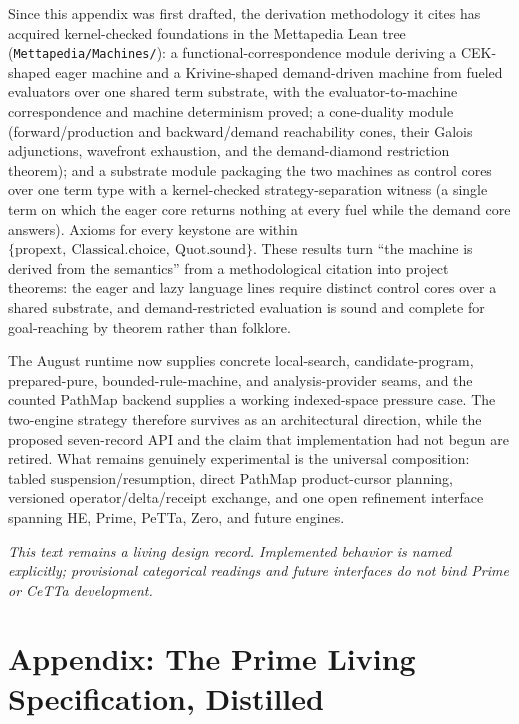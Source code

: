\documentclass[11pt]{article}
\newcommand{\code}[1]{\texttt{#1}}
\newcommand{\PeTTa}{\textup{PeTTa}}
\newcommand{\CeTTa}{\textup{CeTTa}}
\newcommand{\PathMap}{\textup{PathMap}}
\begin{document}
Since this appendix was first drafted, the derivation methodology it
cites has acquired kernel-checked foundations in the Mettapedia Lean
tree (\code{Mettapedia/Machines/}): a functional-correspondence module
deriving a CEK-shaped eager machine and a Krivine-shaped demand-driven
machine from fueled evaluators over one shared term substrate, with the
evaluator-to-machine correspondence and machine determinism proved; a
cone-duality module (forward/production and backward/demand reachability
cones, their Galois adjunctions, wavefront exhaustion, and the
demand-diamond restriction theorem); and a substrate module packaging
the two machines as control cores over one term type with a
kernel-checked strategy-separation witness (a single term on which the
eager core returns nothing at every fuel while the demand core answers).
Axioms for every keystone are within
$\{\text{propext},\ \text{Classical.choice},\ \text{Quot.sound}\}$.
These results turn ``the machine is derived from the semantics'' from a
methodological citation into project theorems: the eager and lazy
language lines require distinct control cores over a shared substrate,
and demand-restricted evaluation is sound and complete for
goal-reaching by theorem rather than folklore.

The August runtime now supplies concrete local-search, candidate-program,
prepared-pure, bounded-rule-machine, and analysis-provider seams, and the
counted \PathMap{} backend supplies a working indexed-space pressure case.
The two-engine strategy therefore survives as an architectural direction,
while the proposed seven-record API and the claim that implementation had not
begun are retired.  What remains genuinely experimental is the universal
composition: tabled suspension/resumption, direct \PathMap{} product-cursor
planning, versioned operator/delta/receipt exchange, and one open refinement
interface spanning HE, Prime, \PeTTa{}, Zero, and future engines.

\emph{This text remains a living design record.  Implemented behavior is named
explicitly; provisional categorical readings and future interfaces do not
bind Prime or \CeTTa{} development.}


\section{Appendix: The Prime Living Specification, Distilled}
\label{app:prime-spec}
\end{document}
